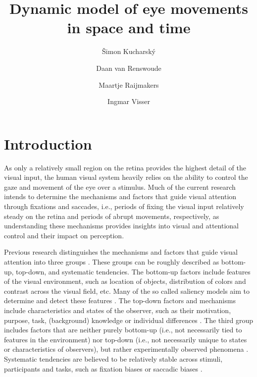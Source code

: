 \documentclass{article}
\begin{document}
\title{Dynamic model of eye movements in space and time}

\author[1]{Šimon Kucharský}
\author[2]{Daan van Renswoude}
\author[1,3]{Maartje Raijmakers}
\author[1]{Ingmar Visser}
\date{}
\doublespacing
\clearpage\maketitle
\section{Introduction}

As only a relatively small region on the retina provides the highest detail of the visual input, the human visual system heavily relies on the ability to control the gaze and movement of the eye over a stimulus. Much of the current research intends to determine the mechanisms and factors that guide visual attention through fixations and saccades, i.e., periods of fixing the visual input relatively steady on the retina and periods of abrupt movements, respectively, as understanding these mechanisms provides insights into visual and attentional control and their impact on perception.


Previous research distinguishes the mechanisms and factors that guide visual attention into three groups \citep{itti2015computational,schutt2017likelihood,tatler2008systematic}. These groups can be roughly described as bottom-up, top-down, and systematic tendencies. The bottom-up factors include features of the visual environment, such as location of objects, distribution of colors and contrast across the visual field, etc. Many of the so called saliency models aim to determine and detect these features \citep{itti2001computational,tatler2011salience,xu2014beyond}. The top-down factors and mechanisms include characteristics and states of the observer, such as their motivation, purpose, task, (background) knowledge or individual differences \citep{de2019individual}. The third group includes factors that are neither purely bottom-up (i.e., not necessarily tied to features in the environment) nor top-down (i.e., not necessarily unique to states or characteristics of observers), but rather experimentally observed phenomena \citep{tatler2008systematic}. Systematic tendencies are believed to be relatively stable across stimuli, participants and tasks, such as fixation biases \citep[e.g., central bias; ][]{tatler2007central,renswoude2019central} or saccadic biases \citep[e.g., horizontal and leftward bias; ][]{le_meur2015saccadic,renswoude2016horizontal,foulsham2013leftward,foulsham2018stable}.
\end{document}

